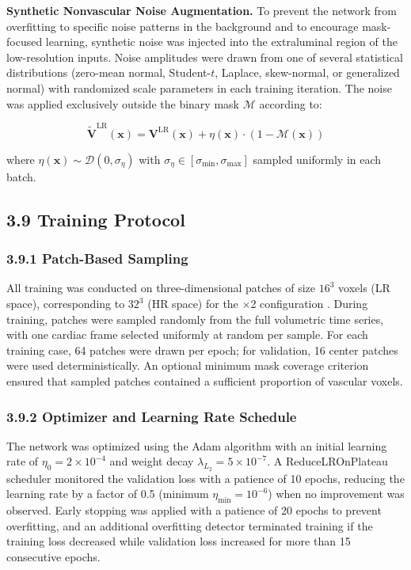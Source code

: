 \documentclass[11pt]{article}
\begin{document}
\textbf{Synthetic Nonvascular Noise Augmentation.} To prevent the network from overfitting to specific noise patterns in the background and to encourage mask-focused learning, synthetic noise was injected into the extraluminal region of the low-resolution inputs. Noise amplitudes were drawn from one of several statistical distributions (zero-mean normal, Student-$t$, Laplace, skew-normal, or generalized normal) with randomized scale parameters in each training iteration. The noise was applied exclusively outside the binary mask $\mathcal{M}$ according to:

\begin{equation}
    \tilde{\mathbf{V}}^{\text{LR}}(\mathbf{x}) = \mathbf{V}^{\text{LR}}(\mathbf{x}) + \eta(\mathbf{x}) \cdot (1 - \mathcal{M}(\mathbf{x}))
\end{equation}

where $\eta(\mathbf{x}) \sim \mathcal{D}(0, \sigma_\eta)$ with $\sigma_\eta \in [\sigma_{\min}, \sigma_{\max}]$ sampled uniformly in each batch.

\subsection*{3.9 Training Protocol}

\subsubsection*{3.9.1 Patch-Based Sampling}

All training was conducted on three-dimensional patches of size $16^3$ voxels (LR space), corresponding to $32^3$ (HR space) for the $\times$2 configuration \cite{peiffer2024patch}. During training, patches were sampled randomly from the full volumetric time series, with one cardiac frame selected uniformly at random per sample. For each training case, 64 patches were drawn per epoch; for validation, 16 center patches were used deterministically. An optional minimum mask coverage criterion ensured that sampled patches contained a sufficient proportion of vascular voxels.

\subsubsection*{3.9.2 Optimizer and Learning Rate Schedule}

The network was optimized using the Adam algorithm \cite{kingma2015adam} with an initial learning rate of $\eta_0 = 2\times10^{-4}$ and weight decay $\lambda_{L_2} = 5\times10^{-7}$. A ReduceLROnPlateau scheduler monitored the validation loss with a patience of 10 epochs, reducing the learning rate by a factor of 0.5 (minimum $\eta_{\min} = 10^{-6}$) when no improvement was observed. Early stopping was applied with a patience of 20 epochs to prevent overfitting, and an additional overfitting detector terminated training if the training loss decreased while validation loss increased for more than 15 consecutive epochs.
\end{document}
